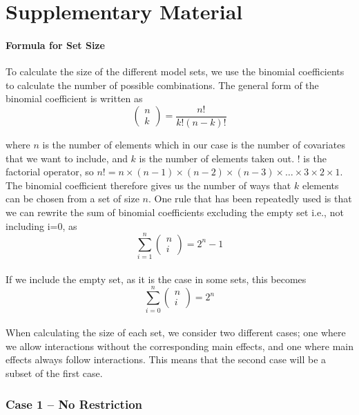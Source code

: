 \part*{Supplementary Material} 

\setcounter{table}{0}
\setcounter{figure}{0}
\renewcommand{\thetable}{S\arabic{table}}
\renewcommand{\thefigure}{S\arabic{figure}}

\subsection{Formula for Set Size}
To calculate the size of the different model sets, we use the binomial coefficients to calculate the number of possible combinations. The general form of the binomial coefficient is written as
\[\left( \begin{array}{c}
n \\ 
k \end{array}
\right)=\frac{n!}{k!\left(n-k\right)!}\] 

where $n$ is the number of elements which in our case is the number of covariates that we want to include, and $k$ is the number of elements taken out. $!$ is the factorial operator, so $n!=n\times \left(n-1\right)\times \left(n-2\right)\times \left(n-3\right)\times \dots \times 3\times 2\times 1$. The binomial coefficient therefore gives us the number of ways that $k$ elements can be chosen from a set of size $n$. One rule that has been repeatedly used is that we can rewrite the sum of binomial coefficients excluding the empty set i.e., not including i=0, as 
\[\sum^n_{i=1}{\left( \begin{array}{c}
n \\ 
i \end{array}
\right)}=2^n-1\] 
\\
If we include the empty set, as it is the case in some sets, this becomes
\[\sum^n_{i=0}{\left( \begin{array}{c}
n \\ 
i \end{array}
\right)}=2^n\] 
\\
When calculating the size of each set, we consider two different cases; one where we allow interactions without the corresponding main effects, and one where main effects always follow interactions. This means that the second case will be a subset of the first case. \\

\section{Case 1 – No Restriction}
